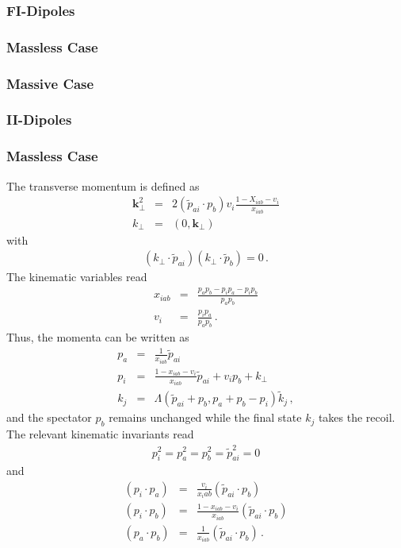 \documentclass[a4paper,10pt]{scrartcl}
\begin{document}
\subsubsection{FI-Dipoles}
\subsubsection*{Massless Case}
\subsubsection*{Massive Case}

\subsubsection{II-Dipoles}
\subsubsection*{Massless Case}
The transverse momentum is defined as
\begin{eqnarray}
 \mathbf{k}_\perp^2
& = & 2(\tilde p_{ai}\cdot p_b) v_i\frac{1-X_{iab}-v_i}{x_{iab}} \\
 k_\perp
& = & \left(0,\mathbf{k}_\perp\right)
\end{eqnarray}
with
\begin{eqnarray}
 (k_\perp\cdot \tilde p_{ai})
 (k_\perp\cdot \tilde p_b) = 0 \,.
\end{eqnarray}
The kinematic variables read
\begin{eqnarray}
 x_{iab}
& = & \frac{p_ap_b-p_ip_a-p_ip_b}{p_ap_b} \\
 v_i
& = & \frac{p_ip_a}{p_ap_b} \,.
\end{eqnarray}
Thus, the momenta can be written as
\begin{eqnarray}
 p_a
& = & \frac{1}{x_{iab}}\tilde p_{ai} \\
 p_i
& = & \frac{1-x_{iab}-v_i}{x_{iab}}\tilde p_{ai}+v_i p_b +k_\perp \\
 k_j
& = & \Lambda\left(\tilde p_{ai}+p_b,p_a+p_b-p_i\right)\tilde k_j \,,
\end{eqnarray}
and the spectator $p_b$ remains unchanged while the final state $k_j$
takes the recoil.
The relevant kinematic invariants read
\begin{eqnarray}
 p_i^2 = p_a^2 = p_b^2 = \tilde p_{ai}^2 = 0
\end{eqnarray}
and
\begin{eqnarray}
 (p_i\cdot p_a)
& = & \frac{v_i}{x_iab}(\tilde p_{ai}\cdot p_b) \\
 (p_i\cdot p_b)
& = & \frac{1-x_{iab}-v_i}{x_{iab}}(\tilde p_{ai}\cdot p_b) \\
 (p_a\cdot p_b)
& = & \frac{1}{x_{iab}}(\tilde p_{ai}\cdot p_b) \,.
\end{eqnarray}
\end{document}
